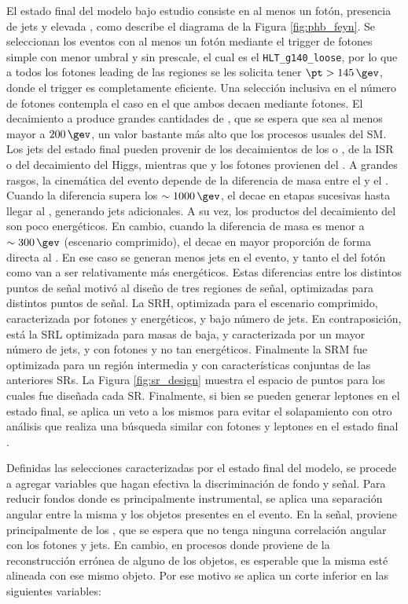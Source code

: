 El estado final del modelo bajo estudio consiste en al menos un fotón, presencia de jets y elevada \met, como describe el diagrama de la Figura \ref{fig:phb_feyn}. 
Se seleccionan los eventos con al menos un fotón mediante 
el trigger de fotones simple con menor umbral y sin prescale, el cual es el \texttt{HLT\_g140\_loose}, por lo que a todos los fotones leading de las regiones se les solicita tener $\pt>145\,\gev$, donde el trigger es completamente eficiente. Una selección inclusiva en el número de fotones contempla el caso en el que ambos \ninoone decaen mediante fotones. El decaimiento a \gravino produce grandes cantidades de \met, que se espera que sea al menos mayor a $200\,\gev$, un valor bastante más alto que los procesos usuales del SM. 
Los jets del estado final pueden provenir de los decaimientos de los \chinoonepm o \ninotwo, de la ISR o del decaimiento del Higgs, mientras que \met y los fotones provienen del \ninoone.
A grandes rasgos, la cinemática del evento depende de la diferencia de masa entre el \gluino y el \ninoone. 
Cuando la diferencia supera los $\sim 1000\,\gev$, el \gluino decae en etapas sucesivas hasta llegar al \ninoone, generando jets adicionales. A su vez, los productos del decaimiento del \ninoone son poco energéticos. En cambio, cuando la diferencia de masa es menor a $\sim 300\,\gev$ (escenario comprimido), el \gluino decae en mayor proporción de forma directa al \ninoone. En ese caso se generan menos jets en el evento, y tanto el \pt del fotón como \met van a ser relativamente más energéticos.
Estas diferencias entre los distintos puntos de señal motivó al diseño de tres regiones de señal, optimizadas para distintos puntos de señal. La SRH, optimizada para el escenario comprimido, caracterizada por fotones y \met energéticos, y bajo número de jets. En contraposición, está la SRL optimizada para masas de \ninoone baja, y caracterizada por un mayor número de jets, y con fotones y \met no tan energéticos. Finalmente la SRM fue optimizada para un región intermedia y con características conjuntas de las anteriores SRs. La Figura \ref{fig:sr_design} muestra el espacio de puntos para los cuales fue diseñada cada SR. Finalmente, si bien se pueden generar leptones en el estado final, se aplica un veto a los mismos para evitar el solapamiento con otro análisis que realiza una búsqueda similar con fotones y leptones en el estado final \cite{diph_8TeV}.


Definidas las selecciones caracterizadas por el estado final del modelo, se procede a agregar variables que hagan efectiva la discriminación de fondo y señal. Para reducir fondos donde \met es principalmente instrumental, se aplica una separación angular entre la misma y los objetos presentes en el evento. En la señal, \met proviene principalmente de los \gravino, que se espera que no tenga ninguna correlación angular con los fotones y jets. En cambio, en procesos donde \met proviene de la reconstrucción errónea de alguno de los objetos, es esperable que la misma esté alineada con ese mismo objeto. Por ese motivo se aplica un corte inferior en las siguientes variables:



